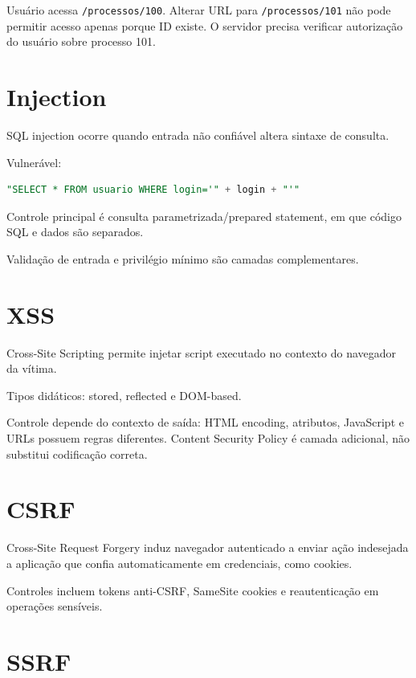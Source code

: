 \begin{exemplo}[IDOR]
Usuário acessa \texttt{/processos/100}. Alterar URL para \texttt{/processos/101} não pode permitir acesso apenas porque ID existe. O servidor precisa verificar autorização do usuário sobre processo 101.
\end{exemplo}

\section{Injection}

SQL injection ocorre quando entrada não confiável altera sintaxe de consulta.

Vulnerável:
\begin{lstlisting}[language=SQL]
"SELECT * FROM usuario WHERE login='" + login + "'"
\end{lstlisting}

Controle principal é consulta parametrizada/prepared statement, em que código SQL e dados são separados.

Validação de entrada e privilégio mínimo são camadas complementares.

\section{XSS}

Cross-Site Scripting permite injetar script executado no contexto do navegador da vítima.

Tipos didáticos: stored, reflected e DOM-based.

Controle depende do contexto de saída: HTML encoding, atributos, JavaScript e URLs possuem regras diferentes. Content Security Policy é camada adicional, não substitui codificação correta.

\section{CSRF}

Cross-Site Request Forgery induz navegador autenticado a enviar ação indesejada a aplicação que confia automaticamente em credenciais, como cookies.

Controles incluem tokens anti-CSRF, SameSite cookies e reautenticação em operações sensíveis.

\section{SSRF}


